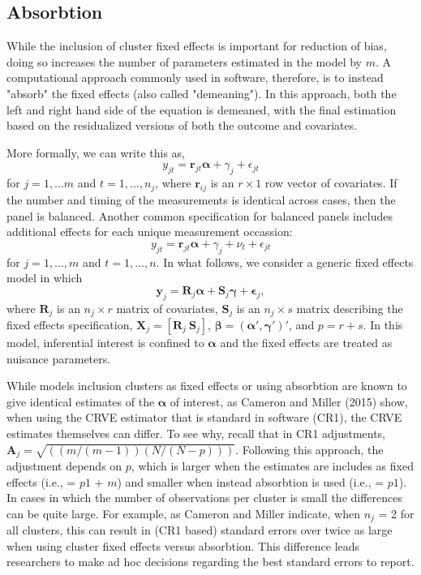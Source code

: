 \documentclass[12pt]{article}
\newcommand{\bm}{\mathbf}
\newcommand{\bs}{\boldsymbol}
\begin{document}


\subsection{Absorbtion}
While the inclusion of cluster fixed effects is important for reduction of bias, doing so increases the number of parameters estimated in the model by $m$. 
A computational approach commonly used in software, therefore, is to instead "absorb" the fixed effects (also called "demeaning"). 
In this approach, both the left and right hand side of the equation is demeaned, with the final estimation based on the residualized versions of both the outcome and covariates. 

More formally, we can write this as,
\[
y_{jt} = \bm{r}_{jt} \bs\alpha + \gamma_j + \epsilon_{jt} \]
for $j=1,...m$ and $t = 1,...,n_j$, where $\bm{r}_{ij}$ is an $r \times 1$ row vector of covariates. If the number and timing of the measurements is identical across cases, then the panel is balanced. Another common specification for balanced panels includes additional effects for each unique measurement occassion:
\[
y_{jt} = \bm{r}_{jt} \bs\alpha + \gamma_j + \nu_t + \epsilon_{jt} \]
for $j=1,...,m$ and $t = 1,...,n$. 
In what follows, we consider a generic fixed effects model in which
\begin{equation}
\label{eq:fixed_effects}
\bm{y}_j = \bm{R}_j \bs\alpha + \bm{S}_j \bs\gamma + \bs\epsilon_j,
\end{equation}
where $\bm{R}_j$ is an $n_j \times r$ matrix of covariates, $\bm{S}_j$ is an $n_j \times s$ matrix describing the fixed effects specification, $\bm{X}_j = \left[\bm{R}_j \ \bm{S}_j\right]$, $\bs\beta = \left(\bs\alpha', \bs\gamma'\right)'$, and $p = r + s$. 
In this model, inferential interest is confined to $\bs{\alpha}$ and the fixed effects are treated as nuisance parameters. 

While models inclusion clusters as fixed effects or using absorbtion are known to give identical estimates of the $\bs{\alpha}$ of interest, as Cameron and Miller (2015) show, when using the CRVE estimator that is standard in software (CR1), the CRVE estimates themselves can differ. 
To see why, recall that in CR1 adjustments, $\bm{A}_j = \sqrt{((m/(m-1))(N/(N-p)))}$. Following this approach, the adjustment depends on $p$, which is larger when the estimates are includes as fixed effects (i.e., = $p1$ + $m$) and smaller when instead absorbtion is used (i.e., = $p1$). 
In cases in which the number of observations per cluster is small the differences can be quite large. 
For example, as Cameron and Miller indicate, when $n_j$ = 2 for all clusters, this can result in (CR1 based) standard errors over twice as large when using cluster fixed effects versus absorbtion. 
This difference leads researchers to make ad hoc decisions regarding the best standard errors to report.
\end{document}
